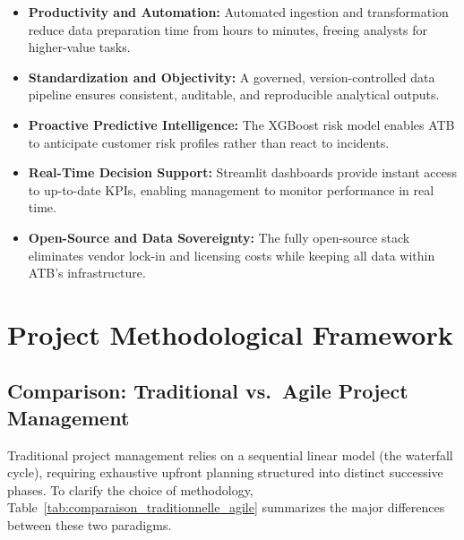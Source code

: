 \begin{itemize}
    \item \textbf{Productivity and Automation:} Automated ingestion and transformation reduce
    data preparation time from hours to minutes, freeing analysts for higher-value tasks.

    \item \textbf{Standardization and Objectivity:} A governed, version-controlled data
    pipeline ensures consistent, auditable, and reproducible analytical outputs.

    \item \textbf{Proactive Predictive Intelligence:} The XGBoost risk model enables ATB to
    anticipate customer risk profiles rather than react to incidents.

    \item \textbf{Real-Time Decision Support:} Streamlit dashboards provide instant access
    to up-to-date KPIs, enabling management to monitor performance in real time.

    \item \textbf{Open-Source and Data Sovereignty:} The fully open-source stack eliminates
    vendor lock-in and licensing costs while keeping all data within ATB's infrastructure.
\end{itemize}

\section{Project Methodological Framework}

\subsection{Comparison: Traditional vs.\ Agile Project Management}

Traditional project management relies on a sequential linear model (the waterfall cycle),
requiring exhaustive upfront planning structured into distinct successive phases. To clarify
the choice of methodology, Table~\ref{tab:comparaison_traditionnelle_agile} summarizes the
major differences between these two paradigms.

